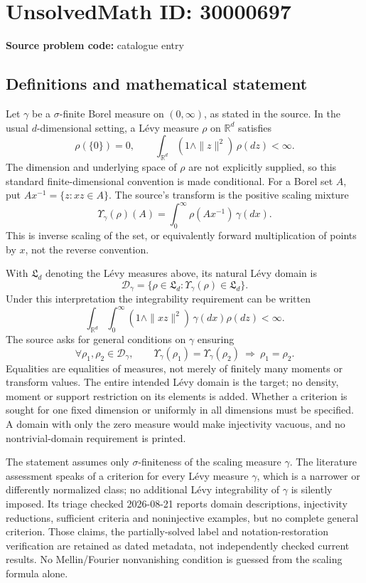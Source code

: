 \documentclass[11pt]{article}
\newcommand{\R}{\mathbb{R}}
\begin{document}
\section*{UnsolvedMath ID: 30000697}
\textbf{Source problem code:} catalogue entry
\subsection{Definitions and mathematical statement}
Let \(\gamma\) be a \(\sigma\)-finite Borel measure on \((0,\infty)\), as stated in the source. In the usual \(d\)-dimensional setting, a L\'evy measure \(\rho\) on \(\R^d\) satisfies
\[
 \rho(\{0\})=0,\qquad
 \int_{\R^d}(1\wedge\|z\|^2)\,\rho(dz)<\infty.
\]
The dimension and underlying space of \(\rho\) are not explicitly supplied, so this standard finite-dimensional convention is made conditional. For a Borel set \(A\), put \(Ax^{-1}=\{z:xz\in A\}\). The source's transform is the positive scaling mixture
\[
 \Upsilon_\gamma(\rho)(A)=\int_0^\infty\rho(Ax^{-1})\,\gamma(dx).
\]
This is inverse scaling of the set, or equivalently forward multiplication of points by \(x\), not the reverse convention.

With \(\mathfrak L_d\) denoting the L\'evy measures above, its natural L\'evy domain is
\[
 \mathcal D_\gamma=\{\rho\in\mathfrak L_d:
 \Upsilon_\gamma(\rho)\in\mathfrak L_d\}.
\]
Under this interpretation the integrability requirement can be written
\[
 \int_{\R^d}\int_0^\infty(1\wedge\|xz\|^2)\,\gamma(dx)\rho(dz)<\infty.
\]
The source asks for general conditions on \(\gamma\) ensuring
\[
 \forall\rho_1,\rho_2\in\mathcal D_\gamma,\qquad
 \Upsilon_\gamma(\rho_1)=\Upsilon_\gamma(\rho_2)
 \ \Longrightarrow\ \rho_1=\rho_2.
\]
Equalities are equalities of measures, not merely of finitely many moments or transform values. The entire intended L\'evy domain is the target; no density, moment or support restriction on its elements is added. Whether a criterion is sought for one fixed dimension or uniformly in all dimensions must be specified. A domain with only the zero measure would make injectivity vacuous, and no nontrivial-domain requirement is printed.

The statement assumes only \(\sigma\)-finiteness of the scaling measure \(\gamma\). The literature assessment speaks of a criterion for every L\'evy measure \(\gamma\), which is a narrower or differently normalized class; no additional L\'evy integrability of \(\gamma\) is silently imposed. Its triage checked 2026-08-21 reports domain descriptions, injectivity reductions, sufficient criteria and noninjective examples, but no complete general criterion. Those claims, the partially-solved label and notation-restoration verification are retained as dated metadata, not independently checked current results. No Mellin/Fourier nonvanishing condition is guessed from the scaling formula alone.
\end{document}
